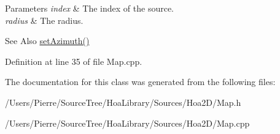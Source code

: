 \begin{DoxyParams}{Parameters}
{\em index} & The index of the source. \\
\hline
{\em radius} & The radius. \\
\hline
\end{DoxyParams}
\begin{DoxySeeAlso}{See Also}
\hyperlink{class_hoa2_d_1_1_map_a0b98a9ad8d1fda90fe5559fd7736050b}{set\-Azimuth()} 
\end{DoxySeeAlso}


Definition at line 35 of file Map.\-cpp.



The documentation for this class was generated from the following files\-:\begin{DoxyCompactItemize}
\item 
/\-Users/\-Pierre/\-Source\-Tree/\-Hoa\-Library/\-Sources/\-Hoa2\-D/Map.\-h\item 
/\-Users/\-Pierre/\-Source\-Tree/\-Hoa\-Library/\-Sources/\-Hoa2\-D/Map.\-cpp\end{DoxyCompactItemize}
